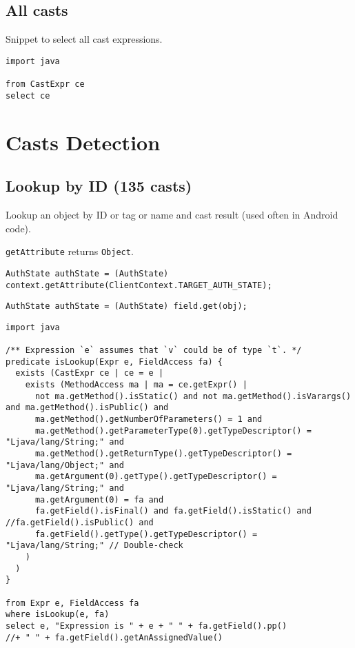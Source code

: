 \section{All casts}
\label{sec:org2553a4b}
Snippet to select all cast expressions.

\lstset{language=ql,label= ,caption= ,captionpos=b,numbers=none}
\begin{lstlisting}
import java

from CastExpr ce
select ce
\end{lstlisting}

\chapter{Casts Detection}
\label{sec:orgec63aa7}
\section{Lookup by ID (135 casts)}
\label{sec:orgc096c00}
Lookup an object by ID or tag or name and cast result (used often in Android code). 

\texttt{getAttribute} returns \texttt{Object}. 

\lstset{language=java,label= ,caption= ,captionpos=b,numbers=none}
\begin{lstlisting}
AuthState authState = (AuthState) context.getAttribute(ClientContext.TARGET_AUTH_STATE); 
\end{lstlisting}

\lstset{language=java,label= ,caption= ,captionpos=b,numbers=none}
\begin{lstlisting}
AuthState authState = (AuthState) field.get(obj); 
\end{lstlisting}

\lstset{language=ql,label= ,caption= ,captionpos=b,numbers=none}
\begin{lstlisting}
import java

/** Expression `e` assumes that `v` could be of type `t`. */
predicate isLookup(Expr e, FieldAccess fa) {
  exists (CastExpr ce | ce = e | 
    exists (MethodAccess ma | ma = ce.getExpr() | 
      not ma.getMethod().isStatic() and not ma.getMethod().isVarargs() and ma.getMethod().isPublic() and 
      ma.getMethod().getNumberOfParameters() = 1 and
      ma.getMethod().getParameterType(0).getTypeDescriptor() = "Ljava/lang/String;" and
      ma.getMethod().getReturnType().getTypeDescriptor() = "Ljava/lang/Object;" and
      ma.getArgument(0).getType().getTypeDescriptor() = "Ljava/lang/String;" and
      ma.getArgument(0) = fa and
      fa.getField().isFinal() and fa.getField().isStatic() and //fa.getField().isPublic() and
      fa.getField().getType().getTypeDescriptor() = "Ljava/lang/String;" // Double-check
    )
  )
}

from Expr e, FieldAccess fa
where isLookup(e, fa)
select e, "Expression is " + e + " " + fa.getField().pp() 
//+ " " + fa.getField().getAnAssignedValue()
\end{lstlisting}


